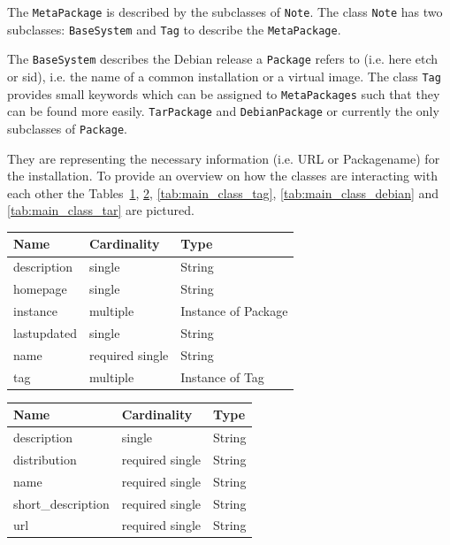 The \texttt{MetaPackage} is described by the subclasses of \texttt{Note}.
The class \texttt{Note} has two subclasses: \texttt{BaseSystem} 
and \texttt{Tag} to describe the \texttt{MetaPackage}.

The \texttt{BaseSystem} describes the Debian release a \texttt{Package}
refers to (i.e. here etch or sid), i.e. the name of a common installation
or a virtual image.
The class \texttt{Tag} provides small keywords which can be assigned to
\texttt{MetaPackages} such that they can be found more easily.
\texttt{TarPackage} and \texttt{DebianPackage}
or currently the only subclasses of \texttt{Package}.

They are representing the necessary information (i.e. URL or Packagename)
for the installation.
To provide an overview on how the classes are
interacting with each other the Tables~\ref{tab:main_class_meta},
\ref{tab:main_class_base}, \ref{tab:main_class_tag},
\ref{tab:main_class_debian} and \ref{tab:main_class_tar} are pictured.

\begin{table}[!h]
   \begin{center}
         \label{tab:main_class_meta}
	\begin{tabular}{p{3cm}p{3cm}p{4cm}}
	\textbf{Name}  & \textbf{Cardinality}  & \textbf{Type}\\
	\hline
	description    & single                & String       \\
	homepage       & single                & String       \\
	instance       & multiple              & Instance of Package       \\
	lastupdated    & single                & String       \\
	name           & required single       & String       \\
	tag            & multiple              & Instance of Tag       \\
	\end{tabular} 
   \end{center}
\end{table}


\begin{table}[!h]
   \begin{center}
         \label{tab:main_class_base}
	\begin{tabular}{p{3cm}p{3cm}p{4cm}}
	\textbf{Name}  & \textbf{Cardinality}  & \textbf{Type}\\
	\hline
	description    & single                & String       \\
	distribution   & required single       & String       \\
	name           & required single       & String       \\
	short\_description & required single   & String       \\
	url            & required single       & String       \\
	\end{tabular} 
   \end{center}
\end{table}


